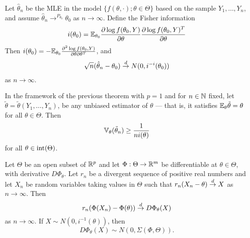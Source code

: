 \begin{thm}
  Let $\hat \theta_{n}$ be the MLE in the model $\{ f(\theta, \cdot);
  \theta \in \Theta \} $ based on the sample $Y_{1}, \dots, Y_{n}$,
  and assume $\hat \theta_{n} \rightarrow^{P_{\theta_{0}}} \theta_{0}$
  as $n \rightarrow \infty$.  Define the Fisher information
  \begin{align}
    \label{eq:15}
    i(\theta_{0}) = \E_{\theta_{0}} \frac{\partial \log f(\theta_{0},
      Y)}{\partial \theta} \frac{\partial \log f(\theta_{0},
      Y)^{T}}{\partial \theta}
  \end{align}
  Then $i(\theta_{0})= - \E_{\theta_{0}} \frac{\partial^{2} \log
    f(\theta_{0}, Y)}{\partial \theta \partial \theta^{T}}$, and
  \begin{align}
    \label{eq:16}
    \sqrt{n} (\hat \theta_{n} - \theta_{0}) \overset{d}{\rightarrow} N(0, i^{-i}(\theta_{0}))
  \end{align} as $n \rightarrow \infty$.
\end{thm}

\begin{thm}
  In the framework of the previous theorem with $p=1$ and for $n \in
  \mathbb{N}$ fixed, let $\tilde \theta = \tilde \theta(Y_{1}, \dots, Y_{n})$,
  be any unbiased estimator of $\theta$ --- that is, it satisfies
  $\E_{\theta} \tilde \theta = \theta$ for all $\theta \in \Theta$.
  Then
  \begin{align}
    \label{eq:17}
    \Var_{\theta}(\tilde \theta_{n}) \geq \frac{1}{ni(\theta)} 
  \end{align} for all $\theta \in \operatorname*{int}(\Theta)$.
\end{thm}

\begin{thm}
  Let $\Theta$ be an open subset of $\mathbb{R}^{p}$ and let $\Phi: \Theta
  \rightarrow \mathbb{R}^{m}$ be differentiable at $\theta \in \Theta$, with
  derivative $D \Phi_{\theta}$.  Let $r_{n}$ be a divergent sequence
  of positive real numbers and let $X_{n}$ be random variables taking
  values in $\Theta$ such that $r_{n}(X_{n} - \theta) \overset{d}{\rightarrow} X$ as $n
  \rightarrow \infty$.  Then
  \begin{equation}
    \label{eq:8}
    r_{n}(\Phi(X_{n}) - \Phi(\theta)) \overset{d}{\rightarrow} D \Phi_{\theta}(X)
  \end{equation} as $n \rightarrow \infty$.  If $X \sim N(0,
  i^{-1}(\theta))$, then
  \begin{equation}
    \label{eq:20}
    D \Phi_{\theta}(X) \sim N(0, \Sigma(\Phi, \Theta)).
  \end{equation}
\end{thm}

